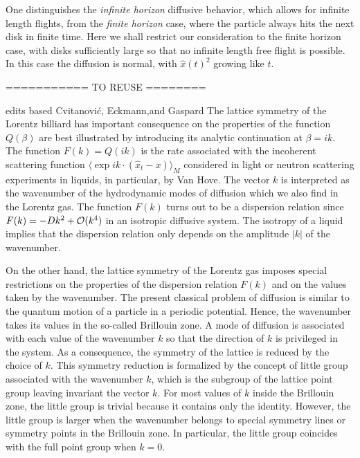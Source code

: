 

One distinguishes
the {\em infinite horizon} diffusive behavior, which allows for infinite
length flights, from
the {\em finite horizon} case, where the particle always
hits the next disk in finite time.
Here we shall restrict
our consideration to the finite horizon case,
with disks sufficiently
large so that no infinite length free flight is possible.
In this case the diffusion is normal, with $\hat{x}(t)^2$
growing like $t$.


\bigskip
=========== TO REUSE ========

    {edits based Cvitanovi\'c,  Eckmann,and Gaspard}
The lattice symmetry of the Lorentz billiard has important consequence on
the properties of the function $Q(\beta)$ are best illustrated by
introducing its analytic continuation at $\beta = i k$.  The function
$F(k)=Q(ik)$ is the rate associated with the incoherent scattering
function $\langle \exp i k \cdot (\hat x_t - x) \rangle_M$ considered in
light or neutron scattering experiments in liquids, in particular, by Van
Hove. The vector $k$ is interpreted as the
wavenumber of the hydrodynamic modes of diffusion which we also find in
the Lorentz gas.  The function $F(k)$ turns out to be a dispersion
relation since $F(k)=-D k^2 + {\cal O}(k^4)$ in an isotropic diffusive
system.  The isotropy of a liquid implies that the dispersion relation
only depends on the amplitude $\vert k\vert$ of the wavenumber.


On the other hand, the lattice symmetry of the Lorentz gas
imposes special restrictions on the properties of the dispersion relation
$F(k)$ and on the values taken by the wavenumber.  The present classical
problem of diffusion is similar to the quantum motion of a particle in a
periodic potential.  Hence, the wavenumber takes its values in the so-called
Brillouin zone.  A mode of diffusion is associated with each value of
the wavenumber $k$ so that the direction of $k$ is privileged in the
system.  As a consequence, the symmetry of the lattice is reduced by the choice
of $k$.  This symmetry reduction is formalized by the concept of little group
associated with the wavenumber $k$, which is the subgroup of the lattice point
group leaving invariant the vector $k$.  For most values of $k$ inside the
Brillouin zone, the little group is trivial because it contains only the
identity.  However, the little group is larger when the wavenumber belongs to
special symmetry lines or symmetry points in the Brillouin zone.  In particular,
the little group coincides with the full point group when $k=0$.

